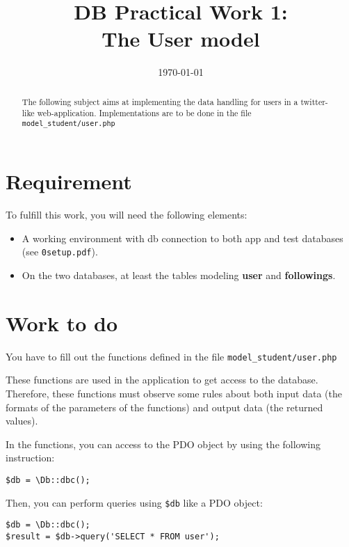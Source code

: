 \documentclass[twoside,a4paper,12pt]{article}
\title{DB Practical Work 1:\\The User model}
\date{\today}
\begin{document}
\maketitle

\begin{abstract}
  The following subject aims at implementing the data handling for users in a twitter-like web-application. Implementations are to be done in the file \texttt{model\_student/user.php}
\end{abstract}

\tableofcontents

\clearpage

\section{Requirement}
To fulfill this work, you will need the following elements:

\begin{itemize}
\item A working environment with db connection to both app and test databases (see \texttt{0setup.pdf}).
\item On the two databases, at least the tables modeling \textbf{user} and \textbf{followings}.
\end{itemize}

\section{Work to do}
You have to fill out the functions defined in the file \texttt{model\_student/user.php}

These functions are used in the application to get access to the database. Therefore, these functions must observe some rules about both input data (the formats of the parameters of the functions) and output data (the returned values).

In the functions, you can access to the PDO object by using the following instruction:

\begin{lstlisting}
$db = \Db::dbc();
\end{lstlisting}

Then, you can perform queries using \texttt{\$db} like a PDO object:
\begin{lstlisting}
$db = \Db::dbc();
$result = $db->query('SELECT * FROM user');
\end{lstlisting}
\end{document}
